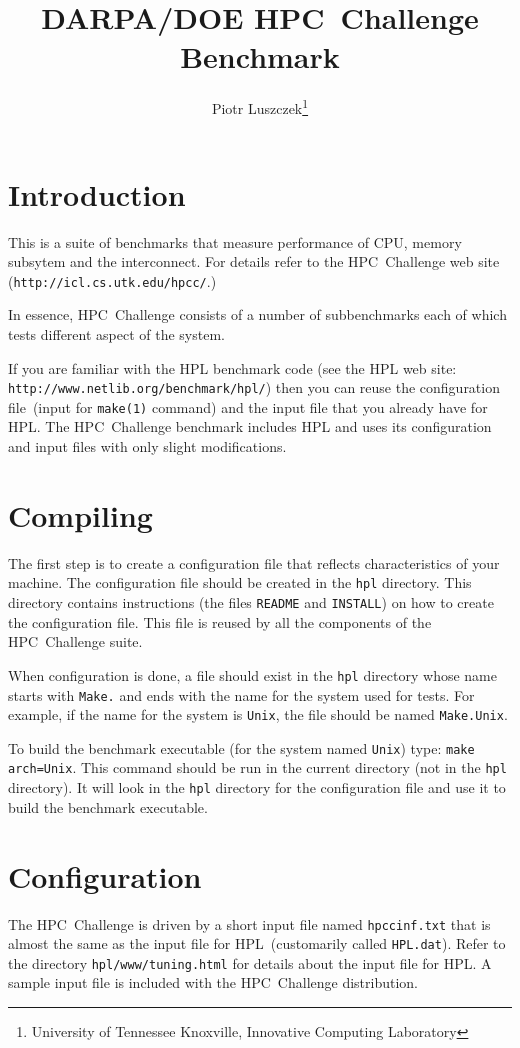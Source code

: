 \documentclass[twocolumn]{article}
\begin{document}
\title{DARPA/DOE HPC~Challenge Benchmark} \author{Piotr
Luszczek\footnote{University of Tennessee Knoxville, Innovative
Computing Laboratory}} \maketitle

\section{Introduction}
This is a suite of benchmarks that measure performance of CPU, memory
subsytem and the interconnect. For details refer to the
HPC~Challenge web site (\texttt{http://icl.cs.utk.edu/hpcc/}.)

In essence, HPC~Challenge consists of a number of subbenchmarks each
of which tests different aspect of the system.

If you are familiar with the HPL benchmark code (see the HPL web site:
\texttt{http://www.netlib.org/benchmark/hpl/}) then you can reuse the
configuration file~(input for \texttt{make(1)} command) and the input
file that you already have for HPL. The HPC~Challenge benchmark
includes HPL and uses its configuration and input files with only
slight modifications.

\section{Compiling}
The first step is to create a configuration file that reflects
characteristics of your machine. The configuration file should be
created in the \texttt{hpl} directory. This directory contains
instructions (the files \texttt{README} and \texttt{INSTALL}) on how
to create the configuration file. This file is reused by all the
components of the HPC~Challenge suite.

When configuration is done, a file should exist in the \texttt{hpl}
directory whose name starts with \texttt{Make.} and ends with the name
for the system used for tests. For example, if the name for the system
is \texttt{Unix}, the file should be named \texttt{Make.Unix}.

To build the benchmark executable (for the system named \texttt{Unix})
type: \texttt{make arch=Unix}.  This command should be run in the
current directory (not in the \texttt{hpl} directory). It will look in
the \texttt{hpl} directory for the configuration file and use it to
build the benchmark executable.

\section{Configuration}
The HPC~Challenge is driven by a short input file named
\texttt{hpccinf.txt} that is almost the same as the input file for
HPL~(customarily called \texttt{HPL.dat}). Refer to the directory
\texttt{hpl/www/tuning.html} for details about the input file for
HPL. A sample input file is included with the HPC~Challenge
distribution.
\end{document}

